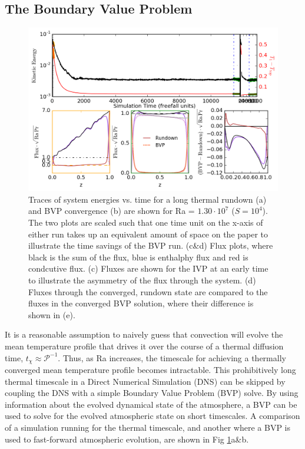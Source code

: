 \documentclass[aps, pre, onecolumn, nofootinbib, notitlepage, groupedaddress, amsfonts, amssymb, amsmath, longbibliography]{revtex4-1}
\begin{document}
\subsection{The Boundary Value Problem}
\begin{figure}[t]
\includegraphics[width=\textwidth]{./figs/time_trace.png}
\caption{Traces of system energies vs. time for a long thermal rundown (a) and BVP convergence
(b) are shown for Ra = $1.30 \cdot 10^7$ ($S = 10^4$).  The two plots are scaled such that
one time unit on the x-axis of either run takes up an equivalent amount of space on the paper
to illustrate the time savings of the BVP run.  (c\&d) Flux plots, where black is the sum of the
flux, blue is enthalphy flux and red is condcutive flux. (c) Fluxes are shown for the IVP at an early
time to illustrate the asymmetry of the flux through the system. (d) Fluxes through the converged,
rundown state are compared to the fluxes in the converged BVP solution, where their difference
is shown in (e). \label{fig:time_trace} }
\end{figure}

It is a reasonable assumption to naively guess that convection will evolve the mean temperature profile that
drives it over the course of a thermal diffusion time, $t_\chi \approx \mathcal{P}^{-1}$. Thus, as Ra
increases, the timescale for achieving a thermally converged mean temperature profile becomes intractable.
This prohibitively long thermal timescale in a Direct Numerical Simulation (DNS) 
can be skipped by coupling the DNS with a simple Boundary Value Problem
(BVP) solve. By using information about the evolved dynamical state of the atmosphere,
a BVP can be used to solve for the evolved atmospheric state on short timescales.
A comparison of a simulation running for the thermal timescale, and another where a BVP is used
to fast-forward atmospheric evolution, are shown in Fig \ref{fig:time_trace}a\&b.
\end{document}

